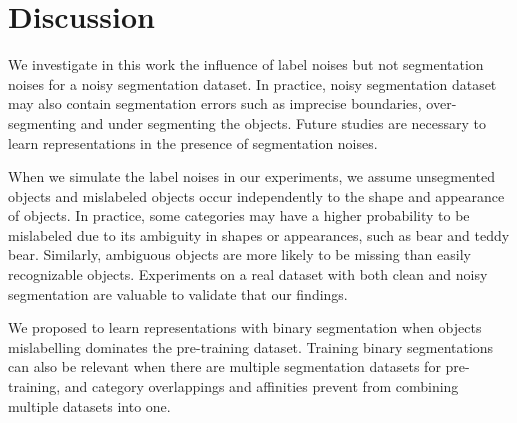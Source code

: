 \section{Discussion}
\label{sec:discussion}


We investigate in this work the influence of label noises but not segmentation noises for a noisy segmentation dataset.
In practice, noisy segmentation dataset may also contain segmentation errors such as imprecise boundaries, over-segmenting and under segmenting the objects.
Future studies are necessary to learn representations in the presence of segmentation noises.

When we simulate the label noises in our experiments, we assume unsegmented objects and mislabeled objects occur independently to the shape and appearance of objects.
In practice, some categories may have a higher probability to be mislabeled due to its ambiguity in shapes or appearances, such as bear and teddy bear.
Similarly, ambiguous objects are more likely to be missing than easily recognizable objects.
Experiments on a real dataset with both clean and noisy segmentation are valuable to validate that our findings.




We proposed to learn representations with binary segmentation when objects mislabelling dominates the pre-training dataset.
Training binary segmentations can also be relevant when there are multiple segmentation datasets for pre-training, and category overlappings and affinities prevent from combining multiple datasets into one.

%




